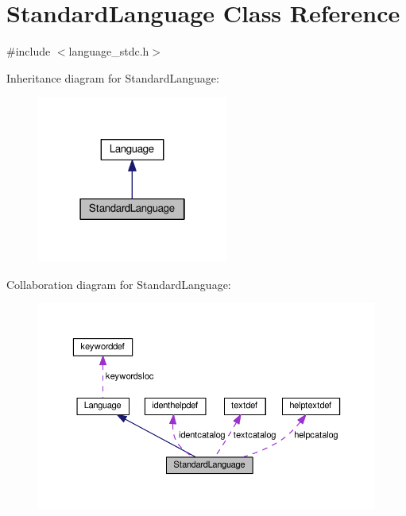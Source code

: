 \hypertarget{classStandardLanguage}{}\section{Standard\+Language Class Reference}
\label{classStandardLanguage}


{\ttfamily \#include $<$language\+\_\+stdc.\+h$>$}



Inheritance diagram for Standard\+Language\+:
\nopagebreak
\begin{figure}[H]
\begin{center}
\leavevmode
\includegraphics[width=178pt]{d0/dab/classStandardLanguage__inherit__graph}
\end{center}
\end{figure}


Collaboration diagram for Standard\+Language\+:
\nopagebreak
\begin{figure}[H]
\begin{center}
\leavevmode
\includegraphics[width=350pt]{d4/d68/classStandardLanguage__coll__graph}
\end{center}
\end{figure}
